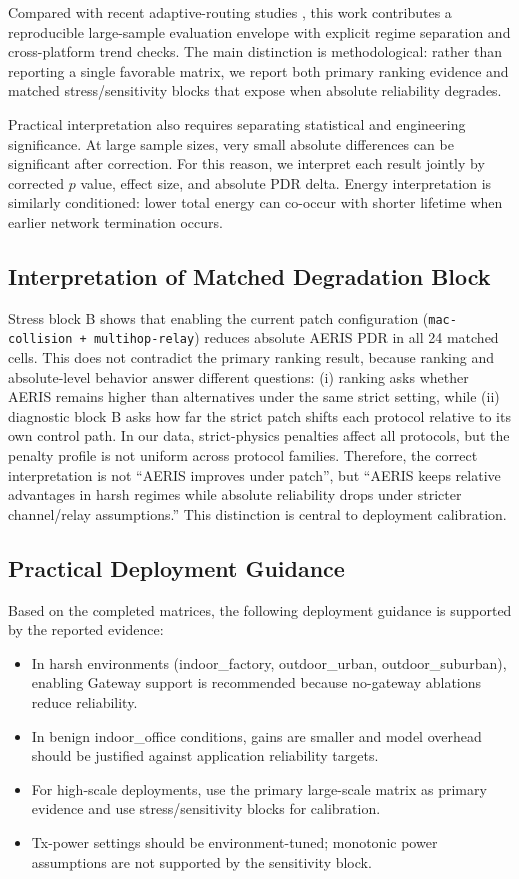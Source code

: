 ﻿\documentclass[sensors,article,submit,moreauthors,pdftex]{Definitions/mdpi}
\begin{document}
Compared with recent adaptive-routing studies \cite{Ren2024,Okine2024,Naeem2024DRL,Zhang2024DRL,Wang2024EECR,Kaddi2024GWOCSMA,Lin2024CoopARQ,Sharma2024QoS}, this work contributes a reproducible large-sample evaluation envelope with explicit regime separation and cross-platform trend checks. The main distinction is methodological: rather than reporting a single favorable matrix, we report both primary ranking evidence and matched stress/sensitivity blocks that expose when absolute reliability degrades.

Practical interpretation also requires separating statistical and engineering significance. At large sample sizes, very small absolute differences can be significant after correction. For this reason, we interpret each result jointly by corrected $p$ value, effect size, and absolute PDR delta. Energy interpretation is similarly conditioned: lower total energy can co-occur with shorter lifetime when earlier network termination occurs.

\subsection*{Interpretation of Matched Degradation Block}
Stress block B shows that enabling the current patch configuration (\texttt{mac-collision + multihop-relay}) reduces absolute AERIS PDR in all 24 matched cells. This does not contradict the primary ranking result, because ranking and absolute-level behavior answer different questions: (i) ranking asks whether AERIS remains higher than alternatives under the same strict setting, while (ii) diagnostic block B asks how far the strict patch shifts each protocol relative to its own control path. In our data, strict-physics penalties affect all protocols, but the penalty profile is not uniform across protocol families. Therefore, the correct interpretation is not ``AERIS improves under patch'', but ``AERIS keeps relative advantages in harsh regimes while absolute reliability drops under stricter channel/relay assumptions.'' This distinction is central to deployment calibration.

\subsection*{Practical Deployment Guidance}
Based on the completed matrices, the following deployment guidance is supported by the reported evidence:
\begin{itemize}
\item In harsh environments (indoor\_factory, outdoor\_urban, outdoor\_suburban), enabling Gateway support is recommended because no-gateway ablations reduce reliability.
\item In benign indoor\_office conditions, gains are smaller and model overhead should be justified against application reliability targets.
\item For high-scale deployments, use the primary large-scale matrix as primary evidence and use stress/sensitivity blocks for calibration.
\item Tx-power settings should be environment-tuned; monotonic power assumptions are not supported by the sensitivity block.
\end{itemize}
\end{document}
